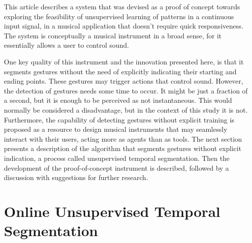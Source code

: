 \documentclass{nime-alternate_MANUSCRIPT} %
\begin{document}
This article describes a system that was devised as a proof of concept towards exploring the feasibility of unsupervised learning of patterns in a continuous input signal, in a musical application that doesn't require quick responsiveness. The system is conceptually a musical instrument in a broad sense, for it essentially allows a user to control sound.

One key quality of this instrument and the innovation presented here, is that it segments gestures without the need of explicitly indicating their starting and ending points. These gestures may trigger actions that control sound. However, the detection of gestures needs some time to occur. It might be just a fraction of a second, but it is enough to be perceived as not instantaneous. This would normally be considered a disadvantage, but in the context of this study it is not. Furthermore, the capability of detecting gestures without explicit training is proposed as a resource to design musical instruments that may seamlessly interact with their users, acting more as agents than as tools. The next section presents a description of the algorithm that segments gestures without explicit indication, a process called unsupervised temporal segmentation. Then the development of the proof-of-concept instrument is described, followed by a discussion with suggestions for further research.

\section{Online Unsupervised Temporal Segmentation}\label{OUTS}
\end{document}
